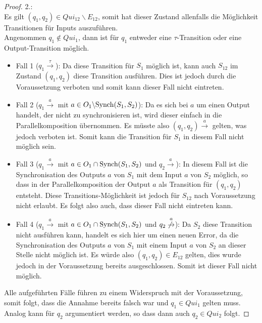 \begin{proof}
  2.:\\
  Es gilt $(q_1,q_2)\in Qui_{12}\backslash E_{12}$, somit hat
  dieser Zustand allenfalls die Möglichkeit Transitionen für Inputs
  auszuführen.\\
  Angenommen $q_1\notin Qui_1$, dann ist für $q_1$ entweder eine
  $\tau$-Transition oder eine Output-Transition möglich.
  \begin{itemize}
    \item Fall 1 \big($q_1 \overset{\tau}{\rightarrow}$\big): Da diese Transition für
      $S_1$ möglich ist, kann auch $S_{12}$ im Zustand $(q_1,q_2)$ diese
      Transition ausführen. Dies ist jedoch durch die Voraussetzung verboten
      und somit kann dieser Fall nicht eintreten.
    \item Fall 2 \big($q_1 \overset{a}{\rightarrow}$ mit $a\in O_1\backslash
      \mathrm{Synch}(S_1,S_2)$\big): Da es sich bei $a$ um einen Output handelt, der nicht
      zu synchronisieren ist, wird dieser einfach in die Parallelkomposition
      übernommen. Es müsste also $(q_1,q_2) \overset{a}{\rightarrow}$ gelten,
      was jedoch verboten ist. Somit kann die Transition für $S_1$ in diesem
      Fall nicht möglich sein.
    \item Fall 3 \big($q_1 \overset{a}{\rightarrow}$ mit $a\in O_1\cap
      \mathrm{Synch}(S_1,S_2)$ und $q_2 \overset{a}{\rightarrow}$\big): In diesem Fall ist
      die Synchronisation des Outputs $a$ von $S_1$ mit dem Input $a$ von $S_2$
      möglich, so dass in der Parallelkomposition der Output $a$ als Transition
      für $(q_1,q_2)$ entsteht. Diese Transitions-Möglichkeit ist jedoch für
      $S_{12}$ nach Voraussetzung nicht erlaubt. Es folgt also auch, dass
      dieser Fall nicht eintreten kann.
    \item Fall 4 \Big($q_1 \overset{a}{\rightarrow}$ mit $a\in O_1\cap
      \mathrm{Synch}(S_1,S_2)$ und $q_2
      \overset{a}{\not{\hspace{-0.1cm}\rightarrow}}$\Big):
      Da $S_2$ diese Transition nicht ausführen kann, handelt es sich hier um
      einen neuen Error, da die Synchronisation des Outputs $a$ von $S_1$ mit
      einem Input $a$ von $S_2$ an dieser Stelle nicht möglich
      ist. Es würde also $(q_1,q_2)\in E_{12}$ gelten, dies wurde jedoch in der
      Voraussetzung bereits ausgeschlossen. Somit ist dieser Fall nicht
      möglich.
  \end{itemize}
  Alle aufgeführten Fälle führen zu einem Widerspruch mit der Voraussetzung,
  somit folgt, dass die Annahme bereits falsch war und $q_1\in Qui_1$ gelten
  muss. Analog kann für $q_2$ argumentiert werden, so dass dann auch $q_2\in
  Qui_2$ folgt.
\end{proof}

